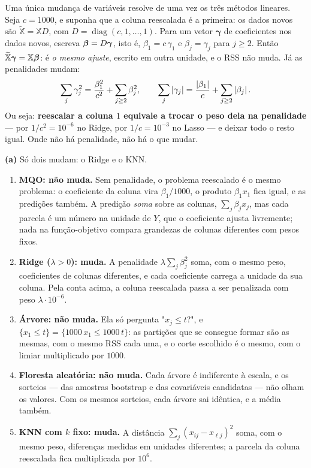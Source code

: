 \begin{solucao}
Uma única mudança de variáveis resolve de uma vez os três métodos lineares. Seja
$c=1000$, e suponha que a coluna reescalada é a primeira: os dados novos são
$\widetilde{\mathbb{X}}=\mathbb{X}D$, com $D=\operatorname{diag}(c,1,\dots,1)$. Para um
vetor $\bm\gamma$ de coeficientes nos dados novos, escreva $\bm{\beta}=D\bm\gamma$, isto é,
$\beta_1=c\,\gamma_1$ e $\beta_j=\gamma_j$ para $j\ge2$. Então
$\widetilde{\mathbb{X}}\bm\gamma=\mathbb{X}\bm{\beta}$: é \emph{o mesmo ajuste}, escrito em
outra unidade, e o RSS não muda. Já as penalidades mudam:
\[
  \sum_j\gamma_j^2=\frac{\beta_1^2}{c^2}+\sum_{j\ge2}\beta_j^2 ,
  \qquad
  \sum_j\left\lvert \gamma_j \right\rvert=\frac{\left\lvert \beta_1 \right\rvert}{c}+\sum_{j\ge2}\left\lvert \beta_j \right\rvert.
\]
Ou seja: \textbf{reescalar a coluna $1$ equivale a trocar o peso dela na penalidade}
--- por $1/c^2=10^{-6}$ no Ridge, por $1/c=10^{-3}$ no Lasso --- e deixar todo o resto
igual. Onde não há penalidade, não há o que mudar.

\smallskip
\textbf{(a)} Só dois mudam: o Ridge e o KNN.
\begin{enumerate}[label=(\roman*),leftmargin=1.0cm]
  \item \textbf{MQO: não muda.} Sem penalidade, o problema reescalado é o mesmo
        problema: o coeficiente da coluna vira $\beta_1/1000$, o produto $\beta_1x_1$
        fica igual, e as predições também. A predição \emph{soma} sobre as colunas,
        $\sum_j\beta_jx_j$, mas cada parcela é um número na unidade de $Y$, que o
        coeficiente ajusta livremente; nada na função-objetivo compara grandezas de
        colunas diferentes com pesos fixos.
  \item \textbf{Ridge ($\lambda>0$): muda.} A penalidade $\lambda\sum_j\beta_j^2$ soma,
        com o mesmo peso, coeficientes de colunas diferentes, e cada coeficiente carrega
        a unidade da sua coluna. Pela conta acima, a coluna reescalada passa a ser
        penalizada com peso $\lambda\cdot10^{-6}$.
  \item \textbf{Árvore: não muda.} Ela só pergunta "$x_j\le t$?", e
        $\{x_1\le t\}=\{1000\,x_1\le1000\,t\}$: as partições que se consegue formar são as
        mesmas, com o mesmo RSS cada uma, e o corte escolhido é o mesmo, com o limiar
        multiplicado por $1000$.
  \item \textbf{Floresta aleatória: não muda.} Cada árvore é indiferente à escala, e os
        sorteios --- das amostras bootstrap e das covariáveis candidatas --- não olham os
        valores. Com os mesmos sorteios, cada árvore sai idêntica, e a média também.
  \item \textbf{KNN com $k$ fixo: muda.} A distância $\sum_j(x_{ij}-x_{\ell j})^2$ soma,
        com o mesmo peso, diferenças medidas em unidades diferentes; a parcela da coluna
        reescalada fica multiplicada por $10^6$.
\end{enumerate}


\end{solucao}
